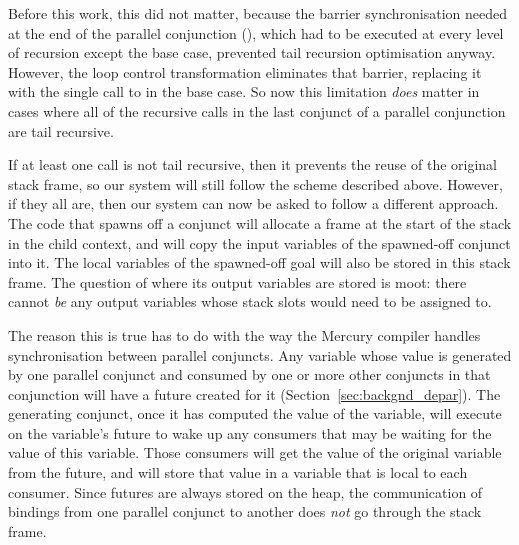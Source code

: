 Before this work, this did not matter, because
the barrier synchronisation needed at the end of the parallel conjunction
(\joinandcontinue),
which had to be executed at every level of recursion except the base case,
prevented tail recursion optimisation anyway.
However, the loop control transformation eliminates that barrier,
replacing it with the single call to \lcfinish in the base case.
So now this limitation \emph{does} matter in cases
where all of the recursive calls in the last conjunct of a parallel conjunction
are tail recursive.

If at least one call is not tail recursive,
then it prevents the reuse of the original stack frame,
so our system will still follow the scheme described above.
However, if they all are,
then our system can now be asked to follow a different approach.
The code that spawns off a conjunct
will allocate a frame at the start of the stack in the child context,
and will copy the input variables of the spawned-off conjunct into it.
The local variables of the spawned-off goal
will also be stored in this stack frame.
The question of where its output variables are stored is moot:
there cannot \emph{be} any output variables
whose stack slots would need to be assigned to.

The reason this is true has to do with the way
the Mercury compiler handles synchronisation between parallel conjuncts.
Any variable whose value is generated by one parallel conjunct
and consumed by one or more other conjuncts in that conjunction
will have a future created for it (Section~\ref{sec:backgnd_depar}).
The generating conjunct, once it has computed the value of the variable,
will execute \signal on the variable's future
to wake up any consumers that may be waiting for the value of this variable.
Those consumers will get the value of the original variable from the future,
and will store that value in a variable that is local to each consumer.
Since futures are always stored on the heap,
the communication of bindings from one parallel conjunct to another
does \emph{not} go through the stack frame.

